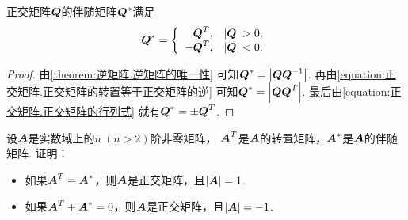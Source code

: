\begin{proposition}
正交矩阵\(\boldsymbol{Q}\)的伴随矩阵\(\boldsymbol{Q}^*\)满足\begin{equation*}
	\boldsymbol{Q}^*
	= \left\{ \begin{array}{rc}
		\boldsymbol{Q}^T, & \abs{\boldsymbol{Q}}>0, \\
		-\boldsymbol{Q}^T, & \abs{\boldsymbol{Q}}<0.
	\end{array} \right.
\end{equation*}
\begin{proof}
由\cref{theorem:逆矩阵.逆矩阵的唯一性}
可知\(\boldsymbol{Q}^* = \abs{\boldsymbol{Q} \boldsymbol{Q}^{-1}}\).
再由\cref{equation:正交矩阵.正交矩阵的转置等于正交矩阵的逆}
可知\(\boldsymbol{Q}^* = \abs{\boldsymbol{Q} \boldsymbol{Q}^T}\).
最后由\cref{equation:正交矩阵.正交矩阵的行列式}
就有\(\boldsymbol{Q}^* = \pm\boldsymbol{Q}^T\).
\end{proof}
\end{proposition}
\begin{example}
设\(\boldsymbol{A}\)是实数域上的\(n\ (n>2)\)阶非零矩阵，
\(\boldsymbol{A}^T\)是\(\boldsymbol{A}\)的转置矩阵，\(\boldsymbol{A}^*\)是\(\boldsymbol{A}\)的伴随矩阵.
证明：\begin{itemize}
	\item 如果\(\boldsymbol{A}^T=\boldsymbol{A}^*\)，则\(\boldsymbol{A}\)是正交矩阵，且\(\abs{\boldsymbol{A}}=1\).
	\item 如果\(\boldsymbol{A}^T+\boldsymbol{A}^*=0\)，则\(\boldsymbol{A}\)是正交矩阵，且\(\abs{\boldsymbol{A}}=-1\).
\end{itemize}
\end{example}


